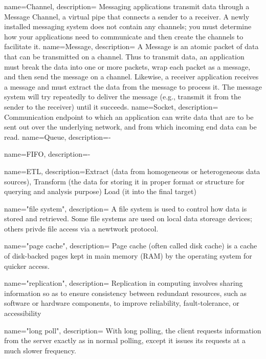 {
    name=Channel,
    description={
        Messaging applications transmit data through a Message Channel, a virtual
        pipe that connects a sender to a receiver. A newly installed messaging
        system does not contain any channels; you must determine how your
        applications need to communicate and then create the channels to facilitate
        it.
    }
}
{
    name=Message,
    description={
        A Message is an atomic packet of data that can be transmitted on a
        channel. Thus to transmit data, an application must break the data into
        one or more packets, wrap each packet as a message, and then send the
        message on a channel. Likewise, a receiver application receives a
        message and must extract the data from the message to process it. The
        message system will try repeatedly to deliver the message (e.g.,
        transmit it from the sender to the receiver) until it succeeds.
    }
}
{
    name=Socket,
    description={
        Communication endpoint to which an application can write data
        that are to be sent out over the underlying network, and from which incoming end
        data can be read. \cite{TAN06}
    }
}
{
    name=Queue,
    description={-}
}


{
    name=FIFO,
    description={-}
}

{
    name=ETL,
    description={Extract (data from homogeneous or heterogeneous data sources), 
         Transform (the data for storing it in proper format or structure
         for querying and analysis purpose)
         Load (it into the final target)
    }
}

{
    name="file system",
    description={
        A file system is used to control how data is stored and retrieved. Some
        file systems are used on local data storeage devices; others privde file
        access via a newtwork protocol.
    }
}

{
    name="page cache",
    description={
        Page cache (often called disk cache) is a cache of disk-backed pages
        kept in main memory (RAM) by the operating system for quicker access.
    }
}

{
    name="replication",
    description={
        Replication in computing involves sharing information so as to ensure
        consistency between redundant resources, such as software or hardware
        components, to improve reliability, fault-tolerance, or accessibility
     }
}

{
    name="long poll",
    description={
        With long polling, the client requests information from the server
        exactly as in normal polling, except it issues its requests at a much
        slower frequency. 
     }
}


